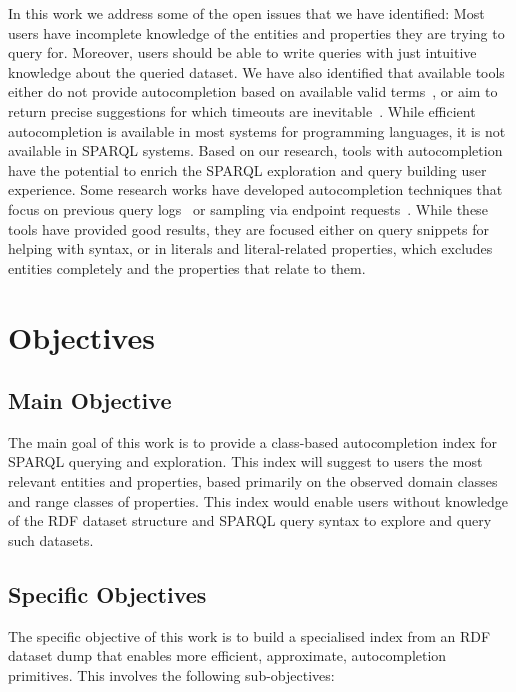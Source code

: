 In this work we address some of the open issues that we have identified: 
Most users have incomplete knowledge of the entities and properties they are trying to query for.
Moreover, users should be able to write queries with just intuitive knowledge about the queried dataset. 
We have also identified that available tools either do not provide autocompletion based on available valid terms~\cite{wikidataQueryService}, or aim to return precise suggestions for which timeouts are inevitable~\cite{Vargas2019}. 
While efficient autocompletion is available in most systems for programming languages, it is not available in SPARQL systems. 
Based on our research, tools with autocompletion have the potential to enrich the SPARQL exploration and query building user experience. 
Some research works have developed autocompletion techniques that focus on previous query logs~\cite{Rafes2018} or sampling via endpoint requests~\cite{El-Roby2016}. 
While these tools have provided good results, they are focused either on query snippets for helping with syntax, or in literals and literal-related properties, which excludes entities completely and the properties that relate to them. 

\section{Objectives}

\subsection{Main Objective}
The main goal of this work is to provide a class-based autocompletion index for SPARQL querying and exploration. 
This index will suggest to users the most relevant entities and properties, based primarily on the observed domain classes and range classes of properties.
This index would enable users without knowledge of the RDF dataset structure and SPARQL query syntax to explore and query such datasets.

\subsection{Specific Objectives}

The specific objective of this work is to build a specialised index from an RDF dataset dump that enables more efficient, approximate, autocompletion primitives. This involves the following sub-objectives:

